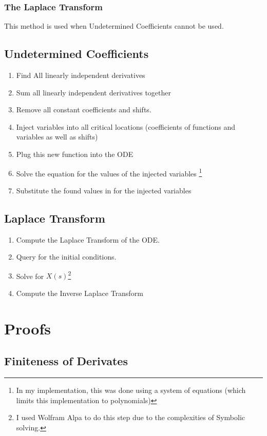 \documentclass{article}
\begin{document}
\subsubsection{The Laplace Transform}
This method is used when Undetermined Coefficients cannot be used.
\subsection{Undetermined Coefficients}
\begin{enumerate}
    \item Find All linearly independent derivatives
    \item Sum all linearly independent derivatives together
    \item Remove all constant coefficients and shifts.
    \item Inject variables into all critical locations (coefficients of functions and variables as well as shifts)
    \item Plug this new function into the ODE
    \item Solve the equation for the values of the injected variables \footnote{In my implementation, this was done using a system of equations (which limits this implementation to polynomials)}
    \item Substitute the found values in for the injected variables
\end{enumerate}

\subsection{Laplace Transform}
\begin{enumerate}
    \item Compute the Laplace Transform of the ODE.
    \item Query for the initial conditions.
    \item Solve for $X(s)$\footnote{I used Wolfram Alpa to do this step due to the complexities of Symbolic solving.}
    \item Compute the Inverse Laplace Transform
\end{enumerate}
\newpage
\section{Proofs}
\subsection{Finiteness of Derivates}
\label{sec:derivative_proofs}
\end{document}
